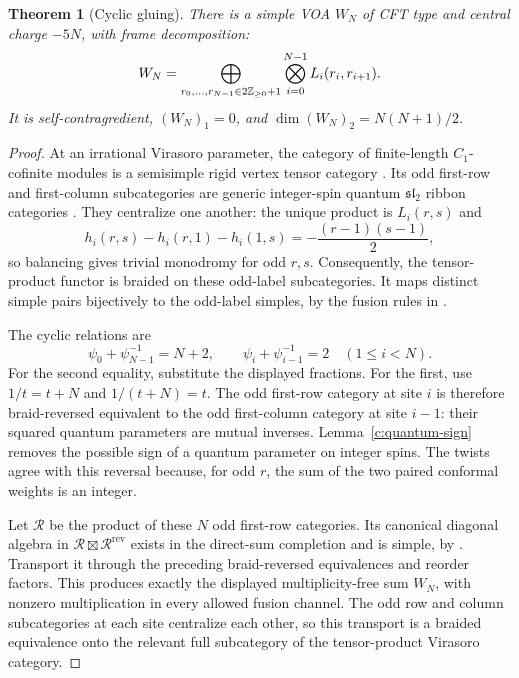 \documentclass[11pt,a4paper]{article}
\numberwithin{equation}{section}
\newtheorem{theorem}{Theorem}[section]
\theoremstyle{definition}\newtheorem{definition}[theorem]{Definition}
\theoremstyle{remark}\newtheorem{remark}[theorem]{Remark}
\newcommand{\bo}{\boxtimes}\newcommand{\Cat}{\mathcal C}
\begin{document}
\begin{theorem}[Cyclic gluing]\label{c:cyclic-gluing}
There is a simple VOA $W_N$ of CFT type and central charge $-5N$,
with frame decomposition:
\[
 W_N=\bigoplus_{r_0,\ldots,r_{N-1}\in2\mathbb Z_{\ge0}+1}
       \bigotimes_{i=0}^{N-1}L_i(r_i,r_{i+1}).
\]
It is self-contragredient, $(W_N)_1=0$, and $\dim(W_N)_2=N(N+1)/2$.
\end{theorem}
\begin{proof}
At an irrational Virasoro parameter, the category of finite-length
$C_1$-cofinite modules is a semisimple rigid vertex tensor category
\cite{virasoro}. Its odd first-row and first-column subcategories are generic integer-spin quantum $\mathfrak{sl}_2$ ribbon categories \cite[Theorem 1.1]{c:Koshida}. They centralize one another: the unique product is $L_i(r,s)$ and
\[
 h_i(r,s)-h_i(r,1)-h_i(1,s)=-\frac{(r-1)(s-1)}2,
\]
so balancing gives trivial monodromy for odd $r,s$. Consequently, the tensor-product functor is braided on these odd-label
subcategories. It maps distinct simple pairs bijectively to the odd-label
simples, by the fusion rules in \cite[Theorem 5.2.5]{virasoro}.

The cyclic relations are
\[
 \psi_0+\psi_{N-1}^{-1}=N+2,\qquad
 \psi_i+\psi_{i-1}^{-1}=2\quad(1\le i<N).
\]
For the second equality, substitute the displayed fractions. For the first, use $1/t=t+N$ and $1/(t+N)=t$. The odd first-row category at site $i$ is therefore braid-reversed equivalent to the odd first-column category at site $i-1$: their squared quantum parameters are mutual inverses. Lemma~\ref{c:quantum-sign} removes the possible sign of a quantum parameter on integer spins. The twists agree with this reversal because, for odd $r$, the sum of the two paired conformal weights is an integer.

Let $\mathcal R$ be the product of these $N$ odd first-row categories. Its canonical diagonal algebra in $\mathcal R\bo\mathcal R^{\mathrm{rev}}$ exists in the direct-sum completion and is simple, by \cite[Theorem 3.5 and Remark 3.7]{gluing}. Transport it through the preceding braid-reversed equivalences and reorder factors. This produces exactly the displayed multiplicity-free sum $W_N$, with nonzero multiplication in every allowed fusion channel. The odd row and column subcategories at each site centralize each other, so this transport is a braided equivalence onto the relevant full subcategory of the tensor-product Virasoro category.


\end{proof}
\end{document}
